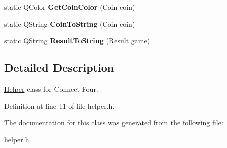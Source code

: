 \begin{DoxyCompactItemize}
\item 
\hypertarget{class_helper_a41d44186f3a08524419153f19aa9b5f2}{static Q\-Color {\bfseries Get\-Coin\-Color} (Coin coin)}\label{class_helper_a41d44186f3a08524419153f19aa9b5f2}

\item 
\hypertarget{class_helper_aeb6829bbdecf8901d143d6a364082919}{static Q\-String {\bfseries Coin\-To\-String} (Coin coin)}\label{class_helper_aeb6829bbdecf8901d143d6a364082919}

\item 
\hypertarget{class_helper_a665cf4e080d1e25199e5545df0cc253c}{static Q\-String {\bfseries Result\-To\-String} (Result game)}\label{class_helper_a665cf4e080d1e25199e5545df0cc253c}

\end{DoxyCompactItemize}


\subsection{Detailed Description}
\hyperlink{class_helper}{Helper} class for Connect Four. 

Definition at line 11 of file helper.\-h.



The documentation for this class was generated from the following file\-:\begin{DoxyCompactItemize}
\item 
helper.\-h\end{DoxyCompactItemize}
